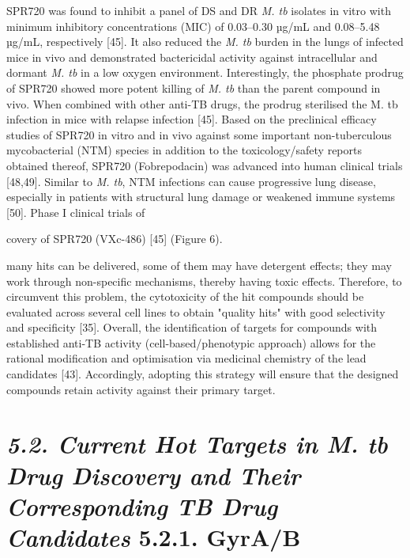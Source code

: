 \documentclass{article}
\begin{document}
SPR720 was found to inhibit a panel of DS and DR \textit{M. tb} isolates in vitro with minimum inhibitory concentrations (MIC) of 0.03–0.30 µg/mL and 0.08–5.48 µg/mL, respectively [45]. It also reduced the \textit{M. tb} burden in the lungs of infected mice in vivo and demonstrated bactericidal activity against intracellular and dormant \textit{M. tb} in a low oxygen environment. Interestingly, the phosphate prodrug of SPR720 showed more potent killing of \textit{M. tb} than the parent compound in vivo. When combined with other anti-TB drugs, the prodrug sterilised the M. tb infection in mice with relapse infection [45]. Based on the preclinical efficacy studies of SPR720 in vitro and in vivo against some important non-tuberculous mycobacterial (NTM) species in addition to the toxicology/safety reports obtained thereof, SPR720 (Fobrepodacin) was advanced into human clinical trials [48,49]. Similar to \textit{M. tb}, NTM infections can cause progressive lung disease, especially in patients with structural lung damage or weakened immune systems [50]. Phase I clinical trials of

covery of SPR720 (VXc-486) [45] (Figure 6).

many hits can be delivered, some of them may have detergent effects; they may work through non-specific mechanisms, thereby having toxic effects. Therefore, to circumvent this problem, the cytotoxicity of the hit compounds should be evaluated across several cell lines to obtain "quality hits" with good selectivity and specificity [35]. Overall, the identification of targets for compounds with established anti-TB activity (cell-based/phenotypic approach) allows for the rational modification and optimisation via medicinal chemistry of the lead candidates [43]. Accordingly, adopting this strategy will ensure that the designed compounds retain activity against their primary target.

\section{\textit{5.2. Current Hot Targets in M. tb Drug Discovery and Their Corresponding TB Drug Candidates} 5.2.1. GyrA/B}
\end{document}

